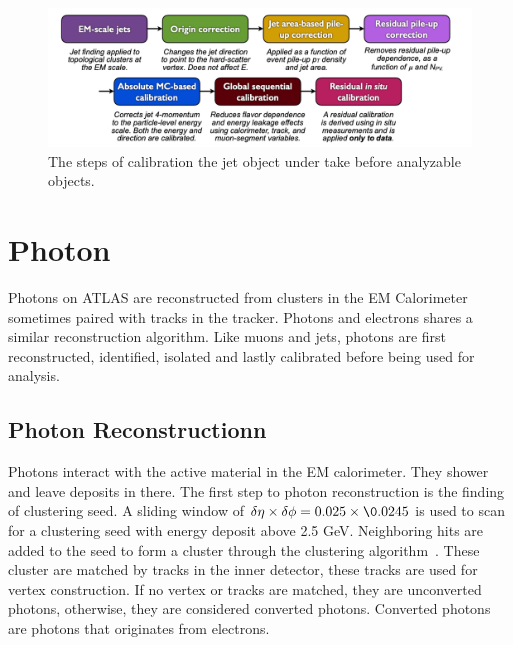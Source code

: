 \begin{figure}[!htb]
    \begin{center}
        \includegraphics[width=1.1\textwidth]{figures/common_ana/JetCalibration}
        \caption{        
            The steps of calibration the jet object under take before analyzable objects\cite{Mehlhase:2770815}.
        }
        \label{fig:JetCalibration}
    \end{center}
\end{figure}

\section{Photon}
\label{sec:Photon}
Photons on ATLAS are reconstructed from clusters in the EM Calorimeter sometimes paired with tracks in the tracker. Photons and electrons shares a similar reconstruction algorithm. Like muons and jets, photons are first reconstructed, identified, isolated and lastly calibrated before being used for analysis. 

\subsection{Photon Reconstructionn}
Photons interact with the active material in the EM calorimeter. They shower and leave deposits in there. The first step to photon reconstruction is the finding of clustering seed. A sliding window of $\delta \eta \times \delta \phi = 0.025 \times \0.0245$ is used to scan for a clustering seed with energy deposit above 2.5 GeV. Neighboring hits are added to the seed to form a cluster through the clustering algorithm~\cite{Lampl:1099735}. 
These cluster are matched by tracks in the inner detector, these tracks are used for vertex construction. If no vertex or tracks are matched, they are unconverted photons, otherwise, they are considered converted photons. Converted photons are photons that originates from electrons. 


